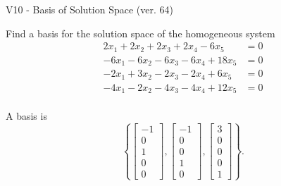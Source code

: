\begin{exercise}
  \begin{exerciseTitle}V10 - Basis of Solution Space (ver. 64)\end{exerciseTitle}
  \begin{exerciseStatement}
    Find a basis for the solution space of the homogeneous system 
\begin{align*}
 2 x_ 1 + 2 x_ 2 + 2 x_ 3 + 2 x_ 4 -6 x_ 5 &= 0  \\ 
  -6 x_ 1 -6 x_ 2 -6 x_ 3 -6 x_ 4 + 18 x_ 5 &= 0  \\ 
  -2 x_ 1 + 3 x_ 2 -2 x_ 3 -2 x_ 4 + 6 x_ 5 &= 0  \\ 
  -4 x_ 1 -2 x_ 2 -4 x_ 3 -4 x_ 4 + 12 x_ 5 &= 0  \\ 
 \end{align*}


 
  \end{exerciseStatement}

  \begin{exerciseAnswer}
   A basis is   
\[\left\{\left[\begin{array}{c}
-1 \\
0 \\
1 \\
0 \\
0
\end{array}\right] , \left[\begin{array}{c}
-1 \\
0 \\
0 \\
1 \\
0
\end{array}\right] , \left[\begin{array}{c}
3 \\
0 \\
0 \\
0 \\
1
\end{array}\right]\right\}.\]

  


  \end{exerciseAnswer}
\end{exercise}